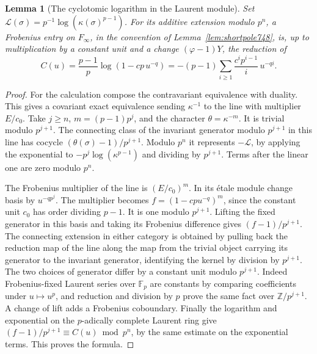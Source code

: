 \documentclass[a4paper,11pt]{article}
\newtheorem{lemma}[proposition]{Lemma}
\theoremstyle{definition}
\theoremstyle{remark}
\numberwithin{equation}{section}
\begin{document}
\begin{lemma}[The cyclotomic logarithm in the Laurent module]
\leavevmode\label{lem:logmatrix748}
Set \(\mathcal L(\sigma)=p^{-1}\log(\kappa(\sigma)^{p-1})\).
For its additive extension modulo \(p^n\), a Frobenius entry on
\(F_\infty\), in the convention of Lemma~\ref{lem:shortpole748},
is, up to multiplication by a constant unit and a change
\((\varphi-1)Y\), the reduction of
\[
 C(u)=\frac{p-1}{p}\log(1-cp\,u^{-q})
      =-(p-1)\sum_{i\ge1}\frac{c^i p^{i-1}}{i}\,u^{-qi}.
\]
\end{lemma}
\begin{proof}
For the calculation compose the contravariant equivalence with
duality. This gives a covariant exact equivalence sending
\(\kappa^{-1}\) to the line with multiplier \(E/c_0\).
Take \(j\ge n\), \(m=(p-1)p^j\), and the character
\(\theta=\kappa^{-m}\). It is trivial modulo \(p^{j+1}\).
The connecting class of the invariant generator modulo \(p^{j+1}\)
in this line has cocycle \((\theta(\sigma)-1)/p^{j+1}\).
Modulo \(p^n\) it represents \(-\mathcal L\), by applying the exponential
to \(-p^j\log(\kappa^{p-1})\) and dividing by \(p^{j+1}\).
Terms after the linear one are zero modulo \(p^n\).

The Frobenius multiplier of the line is \((E/c_0)^m\).
In its \'etale module change basis by \(u^{-q p^j}\).
The multiplier becomes \(f=(1-cp u^{-q})^m\), since the
constant unit \(c_0\) has order dividing \(p-1\).
It is one modulo \(p^{j+1}\). Lifting the fixed generator in
this basis and taking its Frobenius difference gives
\((f-1)/p^{j+1}\). The connecting extension in either category is obtained by
pulling back the reduction map of the line along the
map from the trivial object carrying its generator to the
invariant generator, identifying the kernel by division by
\(p^{j+1}\). The two choices of generator differ by a constant
unit modulo \(p^{j+1}\). Indeed Frobenius-fixed Laurent series
over \(\mathbb F_p\) are constants by comparing coefficients
under \(u\mapsto u^p\), and reduction and division by \(p\)
prove the same fact over \(\mathbb Z/p^{j+1}\). A change of
lift adds a Frobenius coboundary. Finally the logarithm and
exponential on the \(p\)-adically complete Laurent ring give
\((f-1)/p^{j+1}\equiv C(u)\bmod p^n\), by the same estimate
on the exponential terms. This proves the formula.
\end{proof}
\end{document}
